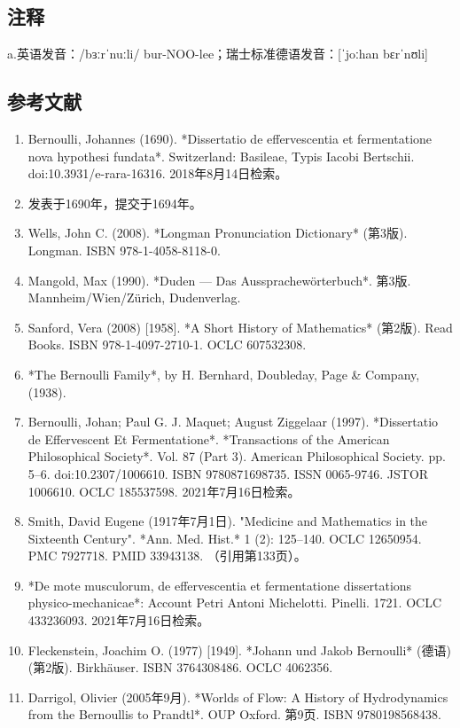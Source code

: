 \subsection{注释}  
a.英语发音：/bɜːrˈnuːli/ bur-NOO-lee；瑞士标准德语发音：[ˈjoːhan bɛrˈnʊli]
\subsection{参考文献}  
\begin{enumerate}
\item Bernoulli, Johannes (1690). *Dissertatio de effervescentia et fermentatione nova hypothesi fundata*. Switzerland: Basileae, Typis Iacobi Bertschii. doi:10.3931/e-rara-16316. 2018年8月14日检索。  
\item 发表于1690年，提交于1694年。  
\item Wells, John C. (2008). *Longman Pronunciation Dictionary* (第3版). Longman. ISBN 978-1-4058-8118-0.  
\item Mangold, Max (1990). *Duden — Das Aussprachewörterbuch*. 第3版. Mannheim/Wien/Zürich, Dudenverlag.  
\item Sanford, Vera (2008) [1958]. *A Short History of Mathematics* (第2版). Read Books. ISBN 978-1-4097-2710-1. OCLC 607532308.  
\item *The Bernoulli Family*, by H. Bernhard, Doubleday, Page & Company, (1938).  
\item Bernoulli, Johan; Paul G. J. Maquet; August Ziggelaar (1997). *Dissertatio de Effervescent Et Fermentatione*. *Transactions of the American Philosophical Society*. Vol. 87 (Part 3). American Philosophical Society. pp. 5–6. doi:10.2307/1006610. ISBN 9780871698735. ISSN 0065-9746. JSTOR 1006610. OCLC 185537598. 2021年7月16日检索。  
\item Smith, David Eugene (1917年7月1日). "Medicine and Mathematics in the Sixteenth Century". *Ann. Med. Hist.* 1 (2): 125–140. OCLC 12650954. PMC 7927718. PMID 33943138. （引用第133页）。  
\item *De mote musculorum, de effervescentia et fermentatione dissertations physico-mechanicae*: Account Petri Antoni Michelotti. Pinelli. 1721. OCLC 433236093. 2021年7月16日检索。  
\item Fleckenstein, Joachim O. (1977) [1949]. *Johann und Jakob Bernoulli* (德语) (第2版). Birkhäuser. ISBN 3764308486. OCLC 4062356.  
\item Darrigol, Olivier (2005年9月). *Worlds of Flow: A History of Hydrodynamics from the Bernoullis to Prandtl*. OUP Oxford. 第9页. ISBN 9780198568438.  

\end{enumerate}
